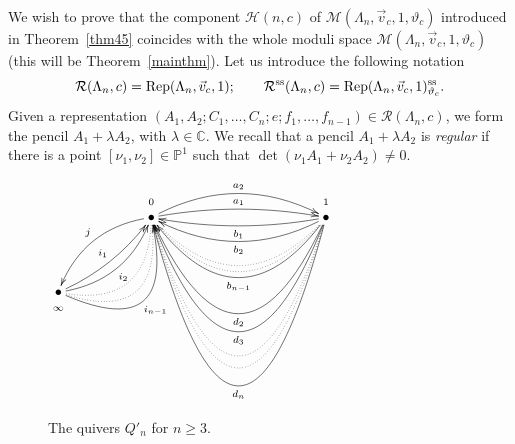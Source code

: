 \documentclass[pdftex]{sigma}
\numberwithin{equation}{section}
\begin{document}
We wish to prove that the component $\mathcal{H} (n,c) $ of $\mathcal{M}(\Lambda_n,\vec{v}_c, 1, \vartheta_c) $ introduced in Theorem~\ref{thm45} coincides with the whole moduli space $\mathcal{M}(\Lambda_n,\vec{v}_c, 1, \vartheta_c)$ (this will be Theorem~\ref{mainthm}). Let us introduce the following notation
\begin{equation*}%
\mathcal{R}(\Lambda_n,c)= \operatorname{Rep}(\Lambda_n,\vec{v}_c,1) ;\qquad \mathcal{R}^{\rm ss}(\Lambda_n,c) =\operatorname{Rep}(\Lambda_n,\vec{v}_c,1)_ {\vartheta_c}^{\rm ss} .
\end{equation*}
Given a representation $(A_1,A_2;C_1, \dots,C_n;e;f_1,\dots,f_{n-1}) \in \mathcal{R}(\Lambda_n,c)$, we form the pencil $A_1 + \lambda A_2$, with $\lambda\in \mathbb{C}$. We recall that a pencil $A_1 + \lambda A_2$ is {\it regular}
if there is a point $[\nu_1,\nu_2]\in \mathbb{P}^1$ such that $\det (\nu_1 A_1 + \nu_2 A_2) \neq 0$.

\begin{figure}[t]\centering
$ \xymatrix@R-2.3em{
&&\mbox{\scriptsize$0$}&&&&\mbox{\scriptsize$1$}\\
&&\bullet\ar@/_3ex/[llddddddd]_{j}\ar@/^/[rrrr]^{a_{1}}\ar@/^4ex/[rrrr]^{a_{2}}&&&&\bullet\ar@/^/[llll]^{b_{1}}
\ar@/^4ex/[llll]^{b_2}\ar@{..}@/^8ex/[llll]\ar@{..}@/^9ex/[llll]
\ar@/^10ex/[llll]^{b_{n-1}} \ar@/^16ex/[llll]^{d_{2}} \ar@/^19ex/[llll]^{d_{3}} \ar@{..}@/^23ex/[llll] \ar@{..}@/^25ex/[llll] \ar@/^28ex/[llll]^{d_{n}} \\ \\ \\ \\ \\ \\ \\
\bullet\ar@/_/[rruuuuuuu]^{i_1}\ar@/_3ex/[rruuuuuuu]_{i_2}\ar@{..}@/_6ex/[rruuuuuuu]\ar@{..}@/_8ex/[rruuuuuuu]\ar@/_10ex/[rruuuuuuu]_{i_{n-1}}&&&&&\\
\mbox{\scriptsize$\infty$}&&&&
}
$
\caption{The quivers $Q'_n$ for $n\ge 3$.}\label{Q'n}
\end{figure}
\end{document}

